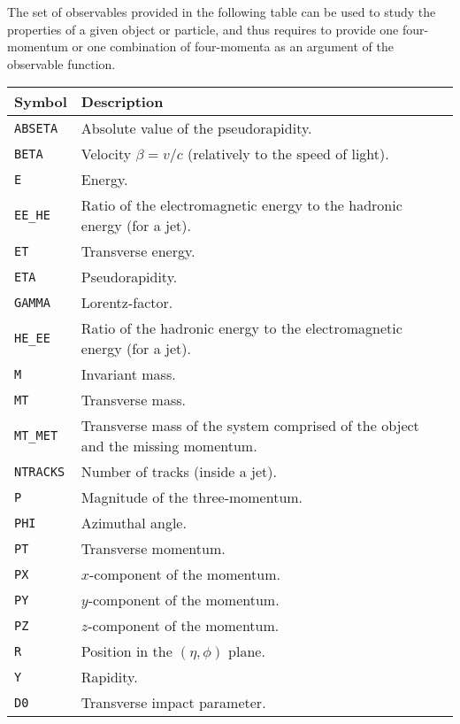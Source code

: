 \documentclass[a4paper]{article}
\begin{document}
The set of observables provided in the following table can be used to study the
properties of a given object or particle, and thus requires to provide one
four-momentum or one combination of four-momenta as an argument of the
observable function.
\renewcommand{\arraystretch}{1.2}%
\begin{center}\begin{tabular}{l p{10.2cm}}
\hline
Symbol& Description\\
\hline
\color{ao} \verb?ABSETA? & Absolute value of the pseudorapidity.\\
\color{ao} \verb?BETA?   & Velocity $\beta=v/c$ (relatively to the speed of light).\\
\color{ao} \verb?E?      & Energy.\\
\color{ao} \verb?EE_HE?  & Ratio of the electromagnetic energy to the hadronic energy (for
   a jet).\\
\color{ao} \verb?ET?     & Transverse energy.\\
\color{ao} \verb?ETA?    & Pseudorapidity.\\
\color{ao} \verb?GAMMA?  & Lorentz-factor.\\
\color{ao} \verb?HE_EE?  & Ratio of the hadronic energy to the electromagnetic energy (for
   a jet).\\
\color{ao} \verb?M?      & Invariant mass.\\
\color{ao} \verb?MT?     & Transverse mass.\\
\color{ao} \verb?MT_MET? & Transverse mass of the system comprised of the object and the
   missing momentum.\\
\color{ao} \verb?NTRACKS?& Number of tracks (inside a jet).\\
\color{ao} \verb?P?      & Magnitude of the three-momentum.\\
\color{ao} \verb?PHI?    & Azimuthal angle.\\
\color{ao} \verb?PT?     & Transverse momentum.\\
\color{ao} \verb?PX?     & $x$-component of the momentum.\\
\color{ao} \verb?PY?     & $y$-component of the momentum.\\
\color{ao} \verb?PZ?     & $z$-component of the momentum.\\
\color{ao} \verb?R?      & Position in the $(\eta, \phi)$ plane.\\
\color{ao} \verb?Y?      & Rapidity.\\
\color{ao} \verb?D0?      & Transverse impact parameter.\\

\end{tabular}
\end{center}
\end{document}
